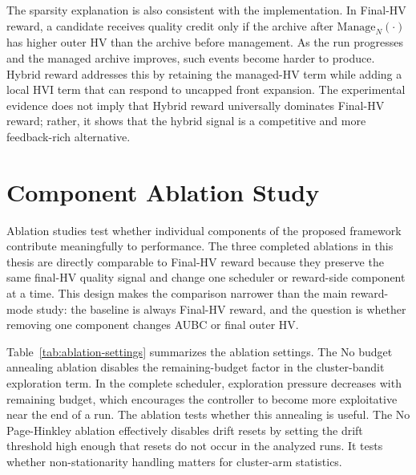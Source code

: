 \documentclass[../main.tex]{subfiles}
\begin{document}
The sparsity explanation is also consistent with the implementation. In Final-HV reward, a candidate receives quality credit only if the archive after $\mathrm{Manage}_N(\cdot)$ has higher outer HV than the archive before management. As the run progresses and the managed archive improves, such events become harder to produce. Hybrid reward addresses this by retaining the managed-HV term while adding a local HVI term that can respond to uncapped front expansion. The experimental evidence does not imply that Hybrid reward universally dominates Final-HV reward; rather, it shows that the hybrid signal is a competitive and more feedback-rich alternative.

\section{Component Ablation Study}

Ablation studies test whether individual components of the proposed framework contribute meaningfully to performance. The three completed ablations in this thesis are directly comparable to Final-HV reward because they preserve the same final-HV quality signal and change one scheduler or reward-side component at a time. This design makes the comparison narrower than the main reward-mode study: the baseline is always Final-HV reward, and the question is whether removing one component changes AUBC or final outer HV.

Table~\ref{tab:ablation-settings} summarizes the ablation settings. The No budget annealing ablation disables the remaining-budget factor in the cluster-bandit exploration term. In the complete scheduler, exploration pressure decreases with remaining budget, which encourages the controller to become more exploitative near the end of a run. The ablation tests whether this annealing is useful. The No Page-Hinkley ablation effectively disables drift resets by setting the drift threshold high enough that resets do not occur in the analyzed runs. It tests whether non-stationarity handling matters for cluster-arm statistics.
\end{document}
